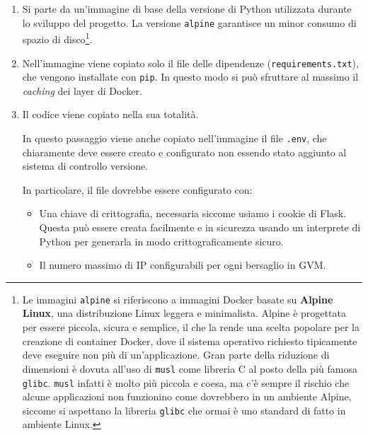 \begin{enumerate}
    \item Si parte da un'immagine di base della versione di Python utilizzata durante lo sviluppo del progetto. La versione \texttt{alpine} garantisce un minor consumo di spazio di disco\footnote{Le immagini \texttt{alpine} si riferiscono a immagini Docker basate su \textbf{Alpine Linux}, una distribuzione Linux leggera e minimalista. Alpine è progettata per essere piccola, sicura e semplice, il che la rende una scelta popolare per la creazione di container Docker, dove il sistema operativo richiesto tipicamente deve eseguire non più di un'applicazione. Gran parte della riduzione di dimensioni è dovuta all'uso di \texttt{musl} come libreria C al posto della più famosa \texttt{glibc}. \texttt{musl} infatti è molto più piccola e coesa, ma c'è sempre il rischio che alcune applicazioni non funzionino come dovrebbero in un ambiente Alpine, siccome si aspettano la libreria \texttt{glibc} che ormai è uno standard di fatto in ambiente Linux.}.
    \item Nell'immagine viene copiato solo il file delle dipendenze (\texttt{requirements.txt}), che vengono installate con \texttt{pip}. In questo modo si può sfruttare al massimo il \emph{caching} dei layer di Docker.
    \item Il codice viene copiato nella sua totalità.

    In questo passaggio viene anche copiato nell'immagine il file \texttt{.env}, che chiaramente deve essere creato e configurato non essendo stato aggiunto al sistema di controllo versione.

    In particolare, il file dovrebbe essere configurato con:
    \begin{itemize}
        \item Una chiave di crittografia, necessaria siccome usiamo i cookie di Flask. Questa può essere creata facilmente e in sicurezza usando un interprete di Python per generarla in modo crittograficamente sicuro.
        \item Il numero massimo di IP configurabili per ogni bersaglio in GVM.
        

\end{itemize}
\end{enumerate}
